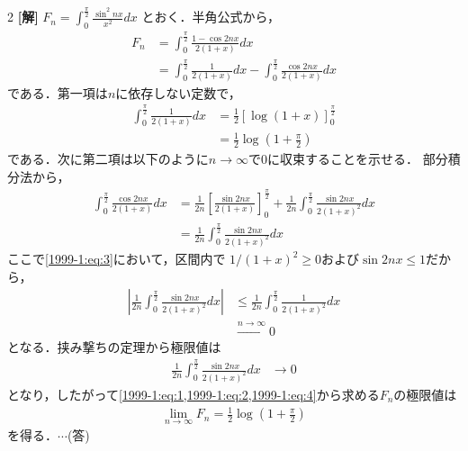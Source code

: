 \documentclass[../../main.tex]{subfiles}
\begin{document}
\setcounter{equation}{0}
\setcounter{figure}{0}
\setcounter{table}{0}
\begin{oframed}
  
\end{oframed}
\setlength{\columnseprule}{0.4pt}
\begin{multicols}{2}
  {\bf[解]}
  $\displaystyle F_n = \int_0^{\frac{\pi}{2}} \frac{\sin^2 nx}{x^2} dx$ とおく．半角公式から，
  \begin{align}
    F_n
     & = \int_0^{\frac{\pi}{2}} \frac{1-\cos 2nx}{2(1+x)} dx \nonumber                                                      \\
     & = \int_0^{\frac{\pi}{2}} \frac{1}{2(1+x)} dx - \int_0^{\frac{\pi}{2}} \frac{\cos 2nx}{2(1+x)} dx \label{1999-1:eq:1}
  \end{align}
  である．第一項は$n$に依存しない定数で，
  \begin{align}
    \int_0^{\frac{\pi}{2}} \frac{1}{2(1+x)} dx
     & = \frac{1}{2} \left[\log(1+x)\right]_0^{\frac{\pi}{2}} \nonumber   \\
     & = \frac{1}{2} \log\left(1+\frac{\pi}{2}\right) \label{1999-1:eq:2}
  \end{align}
  である．次に第二項は以下のように$n\to\infty$で$0$に収束することを示せる．
  部分積分法から，
  \begin{align}
    \int_0^{\frac{\pi}{2}} \frac{\cos 2nx}{2(1+x)} dx
     & = \frac{1}{2n} \left[ \frac{\sin 2nx}{2(1+x)} \right]_0^{\frac{\pi}{2}} + \frac{1}{2n} \int_0^{\frac{\pi}{2}} \frac{\sin 2nx}{2(1+x)^2} dx \nonumber \\
     & =  \frac{1}{2n} \int_0^{\frac{\pi}{2}} \frac{\sin 2nx}{2(1+x)^2} dx \label{1999-1:eq:3}
  \end{align}
  ここで\cref{1999-1:eq:3}において，区間内で $1/(1+x)^2 \ge 0$および$\sin 2nx\le 1$だから，
  \begin{align*}
    \left| \frac{1}{2n} \int_0^{\frac{\pi}{2}} \frac{\sin 2nx}{2(1+x)^2} dx \right|
     & \le \frac{1}{2n} \int_0^{\frac{\pi}{2}} \frac{1}{2(1+x)^2} dx \\
     & \xrightarrow{n \to \infty} 0
  \end{align*}
  となる．挟み撃ちの定理から極限値は
  \begin{align}
    \frac{1}{2n} \int_0^{\frac{\pi}{2}} \frac{\sin 2nx}{2(1+x)^2} dx & \to 0 \label{1999-1:eq:4}
  \end{align}
  となり，したがって\cref{1999-1:eq:1,1999-1:eq:2,1999-1:eq:4}から求める$F_n$の極限値は
  \begin{align*}
    \lim_{n\to\infty} F_n = \frac{1}{2} \log\left(1+\frac{\pi}{2}\right)
  \end{align*}
  を得る．$\cdots$(答)


\end{multicols}
\end{document}
